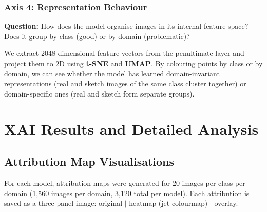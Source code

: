 \documentclass[12pt, a4paper]{article}
\begin{document}
\subsubsection{Axis 4: Representation Behaviour}

\textbf{Question:} How does the model organise images in its internal feature
space?  Does it group by class (good) or by domain (problematic)?

We extract 2048-dimensional feature vectors from the penultimate layer and
project them to 2D using \textbf{t-SNE} and \textbf{UMAP}.  By colouring
points by class or by domain, we can see whether the model has learned
domain-invariant representations (real and sketch images of the same class
cluster together) or domain-specific ones (real and sketch form separate
groups).


\section{XAI Results and Detailed Analysis}
\label{sec:xai_results}

\subsection{Attribution Map Visualisations}

For each model, attribution maps were generated for 20 images per class per
domain (1{,}560 images per domain, 3{,}120 total per model).  Each attribution
is saved as a three-panel image: original $|$ heatmap (jet colourmap) $|$
overlay.
\end{document}
